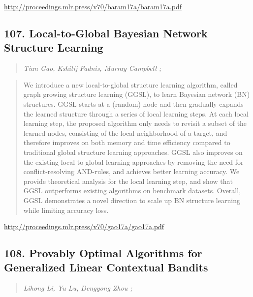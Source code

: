 \documentclass{article}
\begin{document}
\href{http://proceedings.mlr.press/v70/baram17a/baram17a.pdf}{http://proceedings.mlr.press/v70/baram17a/baram17a.pdf}

\subsection{107. Local-to-Global Bayesian Network Structure Learning}

\begin{quote}
\footnotesize{\textit{Tian Gao, Kshitij Fadnis, Murray Campbell ;}}

\end{quote}

\begin{quote}
    We introduce a new local-to-global structure learning algorithm, called graph growing structure learning (GGSL), to learn Bayesian network (BN) structures. GGSL starts at a (random) node and then gradually expands the learned structure through a series of local learning steps. At each local learning step, the proposed algorithm only needs to revisit a subset of the learned nodes, consisting of the local neighborhood of a target, and therefore improves on both memory and time efficiency compared to traditional global structure learning approaches. GGSL also improves on the existing local-to-global learning approaches by removing the need for conflict-resolving AND-rules, and achieves better learning accuracy. We provide theoretical analysis for the local learning step, and show that GGSL outperforms existing algorithms on benchmark datasets. Overall, GGSL demonstrates a novel direction to scale up BN structure learning while limiting accuracy loss.  
\end{quote}

\href{http://proceedings.mlr.press/v70/gao17a/gao17a.pdf}{http://proceedings.mlr.press/v70/gao17a/gao17a.pdf}

\subsection{108. Provably Optimal Algorithms for Generalized Linear Contextual Bandits}

\begin{quote}
\footnotesize{\textit{Lihong Li, Yu Lu, Dengyong Zhou ;}}

\end{quote}
\end{document}
